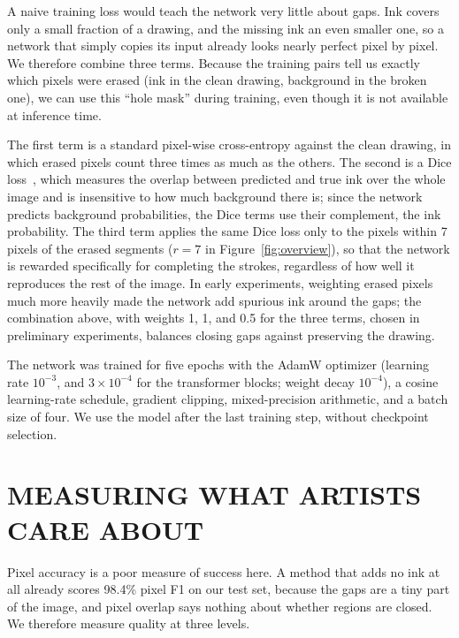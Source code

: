 \documentclass{IEEEcsmag}
\providecommand{\DIFaddtex}[1]{{\color{blue}#1}} %
\providecommand{\DIFdeltex}[1]{} %
\providecommand{\DIFaddbegin}{} %
\providecommand{\DIFaddend}{} %
\providecommand{\DIFdelbegin}{} %
\providecommand{\DIFdelend}{} %
\providecommand{\DIFaddtex}[1]{\DIFaddtex{#1}} %
\providecommand{\DIFdeltex}[1]{\DIFdeltex{#1}} %
\providecommand{\DIFaddbegin}{} %
\providecommand{\DIFadd}[1]{\texorpdfstring{\DIFaddtex{#1}}{#1}} %
\providecommand{\DIFdel}[1]{\texorpdfstring{\DIFdeltex{#1}}{}} %
\begin{document}
A naive training loss would teach the network very little about gaps. Ink covers only
a small fraction of a drawing, and the missing ink an even smaller one, so a network
that simply copies its input already looks nearly perfect pixel by pixel. We
therefore combine three terms. Because the training pairs tell us exactly which
pixels were erased \DIFdelbegin \DIFdel{, }\DIFdelend \DIFaddbegin \DIFadd{(ink in the clean drawing, background in the broken one), }\DIFaddend we can
use this ``hole mask'' during training, even though it is
not available at inference time.

The first term is a standard pixel-wise cross-entropy against the clean drawing, in
which erased pixels count three times as much as the others. The second is a Dice
loss~\cite{milletari2016vnet}, which measures the overlap between predicted and true
ink over the whole image and is insensitive to how much background there is\DIFaddbegin \DIFadd{; since
the network predicts background probabilities, the Dice terms use their complement,
the ink probability}\DIFaddend . The third \DIFaddbegin \DIFadd{term }\DIFaddend applies the same Dice loss only to \DIFdelbegin \DIFdel{a 15-pixel-wide neighborhood around the erased segments}\DIFdelend \DIFaddbegin \DIFadd{the pixels
within 7 pixels of the erased segments ($r=7$ in Figure~\ref{fig:overview})}\DIFaddend , so that the network is rewarded specifically for completing the
strokes, regardless of how well it reproduces the rest of the image. In early
experiments, weighting erased pixels much more heavily made the network add spurious
ink around the gaps; the combination above\DIFaddbegin \DIFadd{, with weights 1, 1, and 0.5 for the three
terms, chosen in preliminary experiments, }\DIFaddend balances closing gaps against preserving
the drawing.

The network was trained for five epochs with the AdamW optimizer \DIFdelbegin \DIFdel{, }\DIFdelend \DIFaddbegin \DIFadd{(learning rate
$10^{-3}$, and $3\times 10^{-4}$ for the transformer blocks; weight decay $10^{-4}$),
a cosine learning-rate schedule, gradient clipping, }\DIFaddend mixed-precision arithmetic, and
a batch size of four. \DIFaddbegin \DIFadd{We use the model after the last training step, without
checkpoint selection.
}\DIFaddend 

\section{MEASURING WHAT ARTISTS CARE ABOUT}

Pixel accuracy is a poor measure of success here. A method that adds no ink at all
already scores 98.4\% pixel F1 on our test set, because the gaps are a tiny part of
the image, and pixel overlap says nothing about whether regions are closed. We
therefore measure quality at three levels.
\end{document}
